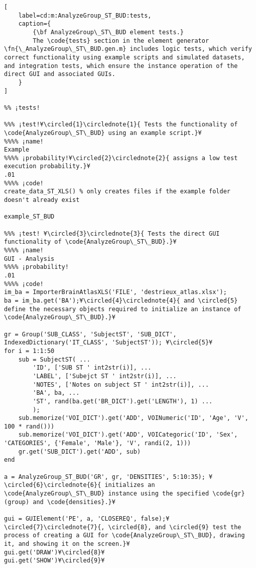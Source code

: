 \documentclass{tufte-handout}
\begin{document}
\begin{lstlisting}[
	label=cd:m:AnalyzeGroup_ST_BUD:tests,
	caption={
		{\bf AnalyzeGroup\_ST\_BUD element tests.}
		The \code{tests} section in the element generator \fn{\_AnalyzeGroup\_ST\_BUD.gen.m} includes logic tests, which verify correct functionality using example scripts and simulated datasets, and integration tests, which ensure the instance operation of the direct GUI and associated GUIs.
	}
]	

%% ¡tests!

%%% ¡test!¥\circled{1}\circlednote{1}{ Tests the functionality of \code{AnalyzeGroup\_ST\_BUD} using an example script.}¥
%%%% ¡name!
Example
%%%% ¡probability!¥\circled{2}\circlednote{2}{ assigns a low test execution probability.}¥
.01
%%%% ¡code! 
create_data_ST_XLS() % only creates files if the example folder doesn't already exist

example_ST_BUD

%%% ¡test! ¥\circled{3}\circlednote{3}{ Tests the direct GUI functionality of \code{AnalyzeGroup\_ST\_BUD}.}¥
%%%% ¡name!
GUI - Analysis
%%%% ¡probability!
.01
%%%% ¡code!
im_ba = ImporterBrainAtlasXLS('FILE', 'destrieux_atlas.xlsx');
ba = im_ba.get('BA');¥\circled{4}\circlednote{4}{ and \circled{5} define the necessary objects required to initialize an instance of \code{AnalyzeGroup\_ST\_BUD}.}¥

gr = Group('SUB_CLASS', 'SubjectST', 'SUB_DICT', IndexedDictionary('IT_CLASS', 'SubjectST')); ¥\circled{5}¥
for i = 1:1:50
    sub = SubjectST( ...
        'ID', ['SUB ST ' int2str(i)], ...
        'LABEL', ['Subejct ST ' int2str(i)], ...
        'NOTES', ['Notes on subject ST ' int2str(i)], ...
        'BA', ba, ...
        'ST', rand(ba.get('BR_DICT').get('LENGTH'), 1) ...
        );
    sub.memorize('VOI_DICT').get('ADD', VOINumeric('ID', 'Age', 'V', 100 * rand()))
    sub.memorize('VOI_DICT').get('ADD', VOICategoric('ID', 'Sex', 'CATEGORIES', {'Female', 'Male'}, 'V', randi(2, 1)))
    gr.get('SUB_DICT').get('ADD', sub)
end

a = AnalyzeGroup_ST_BUD('GR', gr, 'DENSITIES', 5:10:35); ¥\circled{6}\circlednote{6}{ initializes an \code{AnalyzeGroup\_ST\_BUD} instance using the specified \code{gr} (group) and \code{densities}.}¥

gui = GUIElement('PE', a, 'CLOSEREQ', false);¥\circled{7}\circlednote{7}{, \circled{8}, and \circled{9} test the process of creating a GUI for \code{AnalyzeGroup\_ST\_BUD}, drawing it, and showing it on the screen.}¥
gui.get('DRAW')¥\circled{8}¥
gui.get('SHOW')¥\circled{9}¥


\end{lstlisting}
\end{document}
